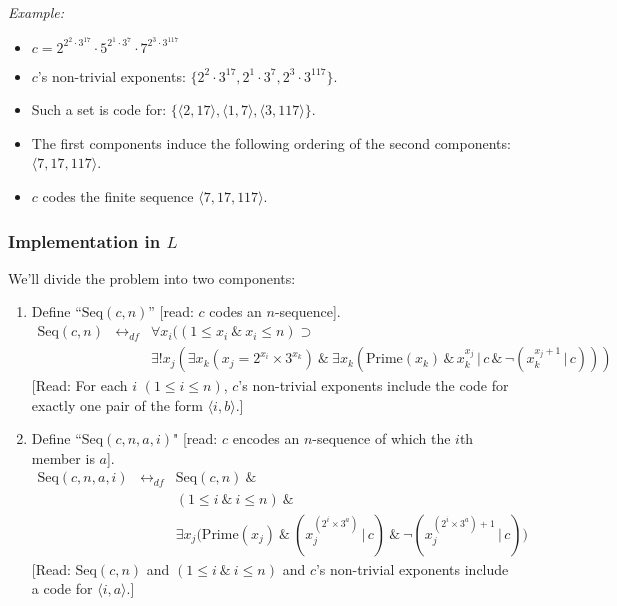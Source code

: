 \documentclass[12pt]{extarticle}
\begin{document}
\vspace{6mm}
\noindent
\emph{Example:}


\begin{itemize}


\item \(c= 2^{2^2 \cdot 3^{17}} \cdot 5^{2^1 \cdot 3^7} \cdot 7^{2^3 \cdot 3^{117}}\)

\item \(c\)'s non-trivial exponents: $\{2^2 \cdot 3^{17},2^1 \cdot 3^7,2^3 \cdot 3^{117}\}$. 


\item Such a set is code for: \(\{\langle 2,17 \rangle, \langle 1,7 \rangle, \langle 3,117 \rangle\}\).

\item The first components induce the following ordering of the second components: \(\langle 7,17,117\rangle\).

\item $c$ codes the finite sequence  \(\langle 7,17,117\rangle\).

\end{itemize}


\subsubsection*{Implementation in $L$}

We'll divide the problem into two components:
\begin{enumerate}


\item Define ``$\text{Seq}(c,n)$'' [read: $c$ codes an $n$-sequence].
\[
\begin{array}{ccl}
\text{Seq}(c,n)  &\leftrightarrow_{df}  &\forall x_i ((1 \leq x_i \ \& \ x_i \leq n) \supset\\
& & \exists ! x_j (\exists x_k (x_j = 2^{x_i} \times 3^{x_k})\ \& \ \exists x_k (\text{Prime}(x_k) \, \& \, x_k^{x_j} \, |\, c \,\&\, \neg(x_k^{x_j+1} \, |\, c))) 


\end{array}
\]
[Read: For each \(i\) \((1 \leq i \leq n)\), $c$'s non-trivial exponents include the code for exactly one pair of the form \(\langle i,b\rangle\).]



\item Define  ``\(\mbox{Seq}(c,n,a,i)\)" [read: \(c\) encodes an \(n\)-sequence of which the \(i\)th member is \(a\)].
\[
\begin{array}{ccl}
\text{Seq}(c,n,a,i)  &\leftrightarrow_{df}  &\mbox{Seq}(c,n) \ \& \\
& &  (1 \leq i \ \& \ i\leq n) \ \&\\
& &\exists x_j \big(\mbox{Prime}(x_j) \ \&\ (x_j^{(2^{i} \times 3^{a})} \, | \, c) \ \& \ \neg(x_j^{(2^{i} \times 3^{a})+1} \, | \, c)\big)
\end{array}
\]
[Read: \(\mbox{Seq}(c,n)\) and \((1 \leq i \ \& \ i\leq n)\) and \(c\)'s non-trivial exponents include a code for \(\langle i, a\rangle\).]


\end{enumerate}
\end{document}

